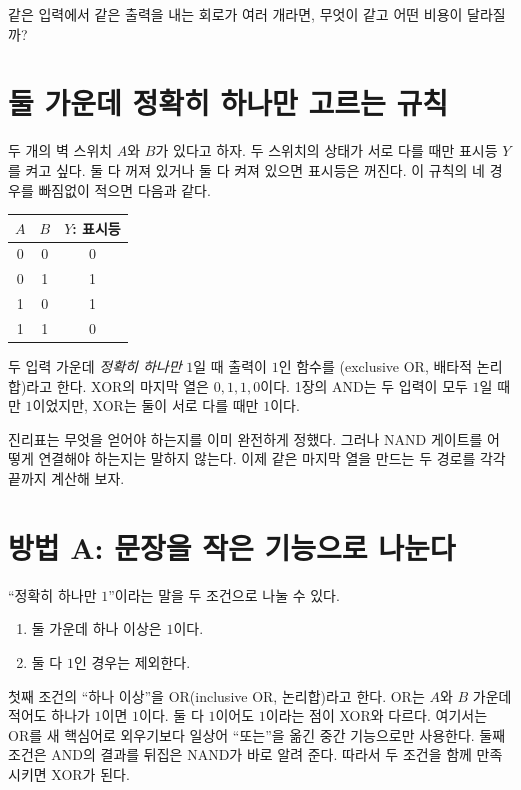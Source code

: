 \begin{objectivebox}
같은 입력에서 같은 출력을 내는 회로가 여러 개라면, 무엇이 같고 어떤 비용이 달라질까?
\end{objectivebox}

\section{둘 가운데 정확히 하나만 고르는 규칙}

두 개의 벽 스위치 $A$와 $B$가 있다고 하자. 두 스위치의 상태가 서로 다를 때만 표시등 $Y$를 켜고 싶다. 둘 다 꺼져 있거나 둘 다 켜져 있으면 표시등은 꺼진다. 이 규칙의 네 경우를 빠짐없이 적으면 다음과 같다.

\begin{center}
\small
\begin{tabular}{ccc}
\toprule
\sffamily\bfseries $A$ & \sffamily\bfseries $B$ & \sffamily\bfseries $Y$: 표시등 \\
\midrule
0 & 0 & 0 \\
0 & 1 & 1 \\
1 & 0 & 1 \\
1 & 1 & 0 \\
\bottomrule
\end{tabular}
\end{center}

두 입력 가운데 \emph{정확히 하나만} $1$일 때 출력이 $1$인 함수를 (exclusive OR, 배타적 논리합)라고 한다. XOR의 마지막 열은 $0,1,1,0$이다. 1장의 AND는 두 입력이 모두 $1$일 때만 $1$이었지만, XOR는 둘이 서로 다를 때만 $1$이다.

진리표는 무엇을 얻어야 하는지를 이미 완전하게 정했다. 그러나 NAND 게이트를 어떻게 연결해야 하는지는 말하지 않는다. 이제 같은 마지막 열을 만드는 두 경로를 각각 끝까지 계산해 보자.

\section{방법 A: 문장을 작은 기능으로 나눈다}

``정확히 하나만 $1$''이라는 말을 두 조건으로 나눌 수 있다.

\begin{enumerate}
  \item 둘 가운데 하나 이상은 $1$이다.
  \item 둘 다 $1$인 경우는 제외한다.
\end{enumerate}

첫째 조건의 ``하나 이상''을 OR(inclusive OR, 논리합)라고 한다. OR는 $A$와 $B$ 가운데 적어도 하나가 $1$이면 $1$이다. 둘 다 $1$이어도 $1$이라는 점이 XOR와 다르다. 여기서는 OR를 새 핵심어로 외우기보다 일상어 ``또는''을 옮긴 중간 기능으로만 사용한다. 둘째 조건은 AND의 결과를 뒤집은 NAND가 바로 알려 준다. 따라서 두 조건을 함께 만족시키면 XOR가 된다.


